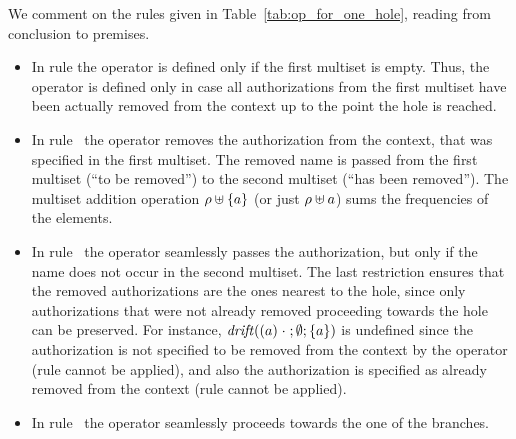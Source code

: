 We comment on the rules given in Table~\ref{tab:op_for_one_hole}, reading from conclusion to premises.
\begin{itemize}
\item
In rule  the operator is defined only if the first multiset is empty. Thus, the operator is defined only in case all authorizations from the first multiset 
have been actually removed from the context up to the point the hole is reached. 
\item 
In rule~ the operator removes the authorization from the context, that was specified in the first multiset. The removed name is passed from the first multiset (``to be removed'')
to the second multiset (``has been removed''). The multiset addition operation $\rho\uplus\{a\}$ (or just $\rho\uplus a$)
 sums the frequencies of the elements. %
\item 
In rule~  the operator seamlessly passes the authorization, but only if the name does not occur in the second multiset. 
The last restriction ensures that the removed authorizations are the ones nearest to the hole, since only authorizations that were not already removed proceeding towards the hole can be preserved.
For instance, $\mathit {drift}((a)\;\cdot\;;\emptyset; \{a\})$ is undefined 
since the authorization is not specified to be removed from the context by the operator (rule  cannot be applied),
and also the authorization is specified as already removed from the context (rule  cannot be applied). 

\item 
In rule~ the operator seamlessly proceeds towards the one of the branches.
\end{itemize}
